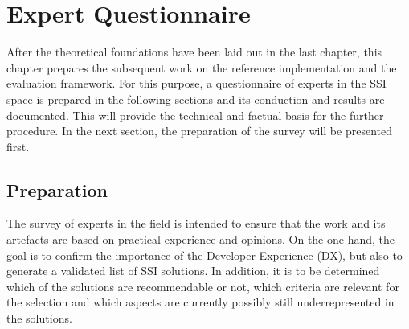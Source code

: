 
\chapter{Expert Questionnaire}\label{chapter: expert}

    
    After the theoretical foundations have been laid out in the last chapter, this chapter prepares the subsequent work on the reference implementation and the evaluation framework. For this purpose, a questionnaire of experts in the \ac{SSI} space is prepared in the following sections and its conduction and results are documented. This will provide the technical and factual basis for the further procedure. In the next section, the preparation of the survey will be presented first.
   
    \section{Preparation}
    
    The survey of experts in the field is intended to ensure that the work and its artefacts are based on practical experience and opinions. On the one hand, the goal is to confirm the importance of the Developer Experience (DX), but also to generate a validated list of \ac{SSI} solutions. In addition, it is to be determined which of the solutions are recommendable or not, which criteria are relevant for the selection and which aspects are currently possibly still underrepresented in the solutions.
    
